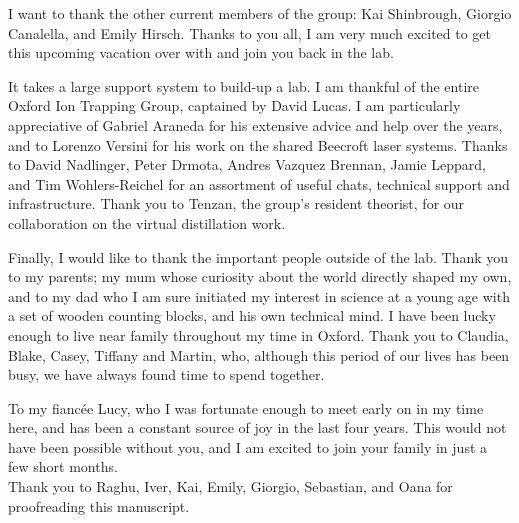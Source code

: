 I want to thank the other current members of the group: Kai Shinbrough, Giorgio Canalella, and Emily Hirsch. Thanks to you all, I am very much excited to get this upcoming vacation over with and join you back in the lab.

It takes a large support system to build-up a lab. I am thankful of the entire Oxford Ion Trapping Group, captained by David Lucas. I am particularly appreciative of Gabriel Araneda for his extensive advice and help over the years, and to Lorenzo Versini for his work on the shared Beecroft laser systems. Thanks to David Nadlinger, Peter Drmota, Andres Vazquez Brennan, Jamie Leppard, and Tim Wohlers-Reichel for an assortment of useful chats, technical support and infrastructure. Thank you to Tenzan, the group's resident theorist, for our collaboration on the virtual distillation work.

Finally, I would like to thank the important people outside of the lab. Thank you to my parents; my mum whose curiosity about the world directly shaped my own, and to my dad who I am sure initiated my interest in science at a young age with a set of wooden counting blocks, and his own technical mind. I have been lucky enough to live near family throughout my time in Oxford. Thank you to Claudia, Blake, Casey, Tiffany and Martin, who, although this period of our lives has been busy, we have always found time to spend together. 

To my fianc\'ee Lucy, who I was fortunate enough to meet early on in my time here, and has been a constant source of joy in the last four years. This would not have been possible without you, and I am excited to join your family in just a few short months.\\

Thank you to Raghu, Iver, Kai, Emily, Giorgio, Sebastian, and Oana for proofreading this manuscript.

